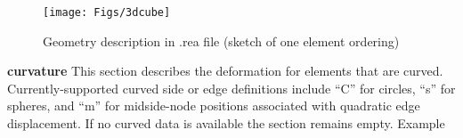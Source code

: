 \begin{description}
\begin{table}
\caption{Geometry description in .rea file}
\end{table}
\normalsize

\begin{figure}
\texttt{[image: Figs/3dcube]}
\caption{Geometry description in .rea file (sketch of one element ordering)}
\end{figure}

\item{\bf curvature} 
     This section describes the deformation for elements that are curved.
     Currently-supported curved side or edge definitions include ``C''
     for circles, ``s'' for spheres, and ``m'' for midside-node positions
     associated with quadratic edge displacement. If no curved data is available the section remains empty.
     Example
     

\end{description}
